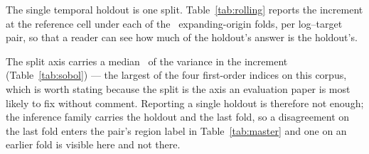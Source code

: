 The single temporal holdout is one split. Table~\ref{tab:rolling} reports the
increment at the reference cell under each of the \nFolds\ expanding-origin
folds, per log--target pair, so that a reader can see how much of the
holdout's answer is the holdout's.



The split axis carries a median \sSplitPct\ of the variance in the increment
(Table~\ref{tab:sobol}) --- the largest of the four first-order indices on
this corpus, which is worth stating because the split is the axis an
evaluation paper is most likely to fix without comment. Reporting a single
holdout is therefore not enough; the inference family carries the holdout
and the last fold, so a disagreement on the last fold enters the pair's
region label in Table~\ref{tab:master} and one on an earlier fold is visible
here and not there.
